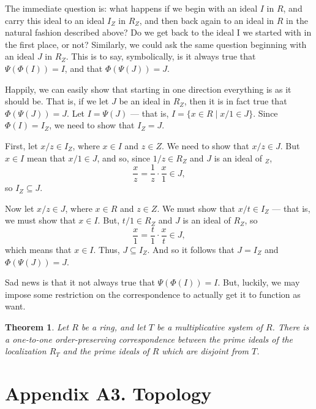 \documentclass[12pt,reqno]{amsart}
\theoremstyle{plain}
\newtheorem{theorem}{Theorem}
\begin{document}
The immediate question is: what happens if we begin with an ideal $I$ in $R$, and carry this ideal to an ideal $I_Z$ in $R_Z$, and then back again to an ideal in $R$ in the natural fashion described above? Do we get back to the ideal I we started with in the first place, or not? Similarly, we could ask the same question beginning with an
ideal $J$ in $R_Z$. This is to say, symbolically, is it always true that $\Psi ( \Phi (I)) = I$, and that $\Phi (\Psi (J)) = J$.

Happily, we can easily show that starting in one direction everything is as it should be. That is, if we let $J$ be an ideal in $R_Z$, then it is in fact true that $\Phi (\Psi (J)) = J$. Let $I = \Psi (J)$ — that is, $I = \{ x \in R \mid x/1 \in J \}$. Since $\Phi (I) = I_Z$, we need to show that $I_Z = J$.

First, let $x/z \in I_Z$, where $x \in I$ and $z \in Z$. We need to show that $x/z \in J$. But $x \in I$ mean that $x/1 \in J$, and so, since $1/ z \in R_Z$ and $J$ is an ideal of $_Z$, 
\[
\frac{x}{z} = \frac{1}{z} \cdot \frac{x}{1} \in J,
\]
so $I_Z \subseteq J$.

Now let $x/z \in J$, where $x \in R$ and $z \in Z$. We must show that $x/t \in I_Z$ — that is, we must show that $x \in I$. But, $t/1 \in R_Z$ and $J$ is an ideal of $R_Z$, so
\[
\frac{x}{1} = \frac{t}{1} \cdot \frac{x}{t} \in J,
\]
which means that $x \in I$. Thus, $J \subseteq I_Z$. And so it follows that $J = I_Z$ and $\Phi (\Psi (J)) = J$. 

Sad news is that it not always true that $\Psi (\Phi (I)) = I$. But, luckily, we may impose some restriction on the correspondence to actually get it to function as want. 
\begin{theorem}
Let $R$ be a ring, and let $T$ be a multiplicative system of $R$. There is a one-to-one order-preserving correspondence between the prime ideals of the localization $R_T$ and the prime ideals of $R$ which are disjoint from $T$.
\end{theorem}
\newpage
\section{Appendix A3. Topology}
\end{document}

